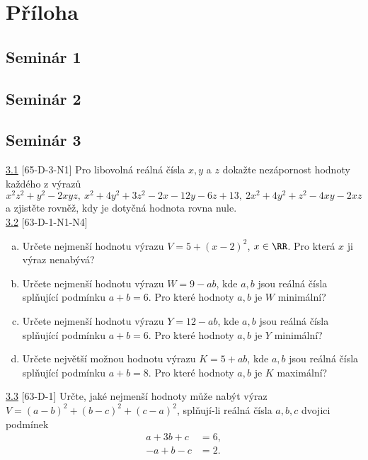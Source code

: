 \chapter*{Příloha}


\section*{Seminár 1}

\section*{Seminár 2}

\section*{Seminár 3}

 \ul{3.1} [65-D-3-N1] Pro libovolná reálná čísla $x, y$ a $z$ dokažte nezápornost hodnoty každého z výrazů $$x^2z^2+ y^2- 2xyz, \ x^2+ 4y^2+ 3z^2- 2x- 12y - 6z + 13, \ 2x^2+ 4y^2 + z^2- 4xy - 2xz$$ a zjistěte rovněž, kdy je dotyčná hodnota rovna nule.\\
 
\noindent \ul{3.2} [63-D-1-N1-N4]
\begin{enumerate}[a)]
\item Určete nejmenší hodnotu výrazu $V = 5 + (x - 2)^2$, $x \in \RR$. Pro která $x$ ji výraz nenabývá?

\item Určete nejmenší hodnotu výrazu $W = 9 - ab$, kde $a, b$ jsou reálná čísla splňující podmínku $a + b = 6$. Pro které hodnoty $a, b$ je $W$ minimální?

\item Určete nejmenší hodnotu výrazu $Y = 12-ab$, kde $a, b$ jsou reálná čísla splňující podmínku $a + b = 6$. Pro které hodnoty $a, b$ je $Y$ minimální?

\item Určete největší možnou hodnotu výrazu $K = 5 + ab$, kde $a, b$ jsou reálná čísla splňující podmínku $a + b = 8$. Pro které hodnoty $a, b$ je $K$ maximální?
\end{enumerate}
 
\noindent \ul{3.3} [63-D-1] Určte, jaké nejmenší hodnoty může nabýt výraz $V = (a-b)^2 +(b-c)^2 +(c-a)^2$, splňují-li reálná čísla $a, b, c$ dvojici podmínek
\begin{align*}
a + 3b + c &= 6,\\
-a + b - c &= 2.
\end{align*}
 
